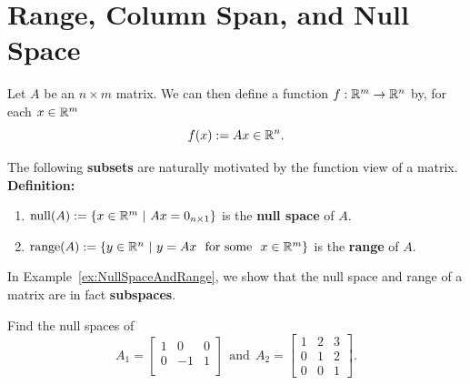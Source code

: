 \Qed


\section{Range, Column Span, and Null Space}
\label{sec:RangeNullSpace}

\begin{tcolorbox}[sharp corners, colback=green!30, colframe=green!80!blue, title=\textbf{\Large A Function View of a Matrix Defines two Subspaces: its Null Space and its Range}]

Let $A$ be an $n \times m$ matrix. We can then define a function $f:\mathbb R^m \to \mathbb R^n$ by, for each $x \in \mathbb R^m$
\begin{equation}
    \label{eq:MatrixAsfunction}
    f(x):= A x \in \mathbb R^n.
\end{equation}

The following \textbf{subsets} are naturally motivated by the function view of a matrix.\\

\textbf{Definition:} 
\begin{enumerate}
\renewcommand{\labelenumi}{(\alph{enumi})}
\setlength{\itemsep}{.2cm}
\item $\mathrm{null}(A):=\{x \in \mathbb R^m~|~ A x = 0_{n \times 1} \}$ is the \textbf{null space} of $A$.
\item $\mathrm{range}(A):=\{ y \in \mathbb R^n ~ |~ y = A x~~\text{for some }~x\in \mathbb R^m\}$ is the \textbf{range} of $A$.
\end{enumerate}

In Example~\ref{ex:NullSpaceAndRange}, we show that the null space and range of a matrix are in fact \textbf{subspaces}.
\end{tcolorbox}

\begin{example}
\label{ex:Subspace04} Find the null spaces of 
$$
    A_1=  \left[\begin{array}{rrc}  1 & 0 & 0 \\  0 & -1 & 1 \\ \end{array} \right]~~\text{and}~~
    A_2=\left[\begin{array}{ccc}  1 & 2 & 3 \\  0 & 1 & 2 \\ 0 & 0 & 1\end{array} \right]. $$
 \end{example}

